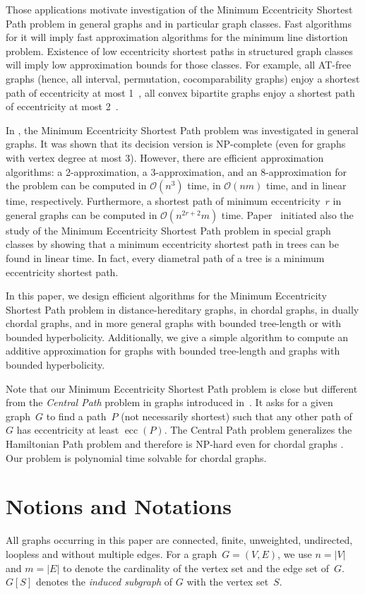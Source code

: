 \documentclass[10pt]{llncs}
\newcommand{\calO}{\mathcal{O}}
\DeclareMathOperator{\ecc}{ecc}
\begin{document}
Those applications motivate investigation of the Minimum Eccentricity Shortest Path problem  in general graphs and in particular graph classes.
Fast algorithms for it will imply fast approximation algorithms for the minimum line distortion problem.
Existence of low eccentricity shortest paths in structured graph classes will imply low approximation bounds for those classes.
For example, all AT-free graphs (hence, all interval, permutation, cocomparability graphs) enjoy a shortest path of eccentricity at most 1~\cite{COS-SICOMP}, all convex bipartite graphs enjoy a shortest path of eccentricity at most 2~\cite{DKL2014}.

In \cite{DrLei2015}, the Minimum Eccentricity Shortest Path problem was investigated in general graphs.
It was shown that its decision version is NP-complete (even for graphs with vertex degree at most 3).
However, there are efficient  approximation algorithms: a 2-approximation, a 3-approximation, and an 8-approximation for the problem can be computed in $\calO(n^3)$ time, in $\calO(nm)$ time, and in linear time, respectively.
Furthermore, a shortest path of minimum eccentricity~$r$ in general graphs can be computed in $\calO(n^{2r+2}m)$ time. 
Paper~\cite{DrLei2015} initiated also the study of the Minimum Eccentricity Shortest Path problem in special graph classes by showing that a minimum eccentricity shortest path in trees can be found in linear time.
In fact, every diametral path of a tree is a minimum eccentricity shortest path. 

In this paper, we design efficient algorithms for the Minimum Eccentricity Shortest Path problem in distance-hereditary graphs, in chordal graphs, in dually chordal graphs, and in more general graphs with bounded tree-length or with bounded hyperbolicity.
Additionally, we give a simple algorithm to compute an additive approximation for graphs with bounded tree-length and graphs with bounded hyperbolicity.

Note that our Minimum Eccentricity Shortest Path problem is close but different from the \emph{Central Path} problem in graphs introduced in~\cite{Slater}. 
It asks for a given graph~$G$ to find a path~$P$ (not necessarily shortest) such that any other path of $G$ has eccentricity at least $\ecc(P)$.
The Central Path problem generalizes the Hamiltonian Path problem and therefore is NP-hard even for chordal graphs \cite{haiko}.
Our problem is polynomial time solvable for chordal graphs. 

\section{Notions and Notations}
All graphs occurring in this paper are connected, finite, unweighted, undirected, loopless and without multiple edges. For a graph~$G = (V, E)$, we use $n = |V|$ and $m = |E|$ to denote the cardinality of the vertex set and the edge set of~$G$.
$G[S]$ denotes the \emph{induced subgraph} of $G$ with the vertex set~$S$. 
\end{document}
